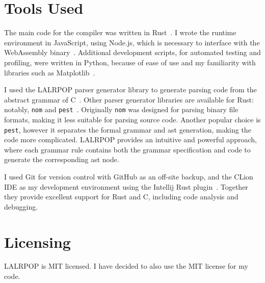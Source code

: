 \documentclass[00-main.tex]{subfiles}
\begin{document}
\section{Tools Used}

The main code for the compiler was written in Rust~.
I wrote the runtime environment in JavaScript, using Node.js, which is necessary to interface with the Web\-Assembly binary~.
Additional development scripts, for automated testing and profiling, were written in Python, because of ease of use and my familiarity with libraries such as Matplotlib~.

I used the LALRPOP parser generator library to generate parsing code from the abstract grammar of C~.
Other parser generator libraries are available for Rust: notably, \texttt{nom} and \texttt{pest}~.
Originally \texttt{nom} was designed for parsing binary file formats, making it less suitable for parsing source code.
Another popular choice is \texttt{pest}, however it separates the formal grammar and \gls{ast} generation, making the code more complicated.
LALRPOP provides an intuitive and powerful approach, where each grammar rule contains both the grammar specification and code to generate the corresponding \gls{ast} node.

I used Git for version control with GitHub as an off-site backup, and the CLion IDE as my development environment using the Intellij Rust plugin~.
Together they provide excellent support for Rust and C, including code analysis and debugging.


\section{Licensing}

LALRPOP is MIT licensed.
I have decided to also use the MIT license for my code.
\end{document}
